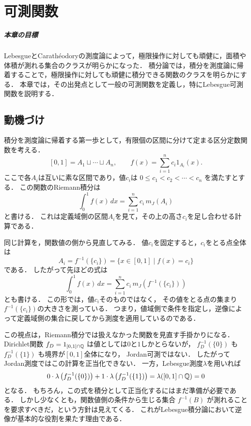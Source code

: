 \setcounter{chapter}{6}
\chapter{可測関数}

\paragraph{本章の目標}
LebesgueとCarathéodoryの測度論によって，極限操作に対しても頑健に，面積や体積が測れる集合のクラスが明らかになった．
積分論では，積分を測度論に帰着することで，極限操作に対しても頑健に積分できる関数のクラスを明らかにする．
本章では，その出発点として一般の可測関数を定義し，特にLebesgue可測関数を説明する．

\section{動機づけ}
積分を測度論に帰着する第一歩として，有限個の区間に分けて定まる区分定数関数を考える．
\[
[0,1]=A_1\sqcup\cdots\sqcup A_n,\qquad
f(x) = \sum_{i=1}^n c_i 1_{A_i}(x).
\]
ここで各$A_i$は互いに素な区間であり，値$c_i$は
$0\le c_1<c_2<\cdots<c_n$ を満たすとする．
この関数のRiemann積分は
\[
\int_0^1 f(x)\,dx = \sum_{i=1}^n c_i\,m_J(A_i)
\]
と書ける．
これは定義域側の区間$A_i$を見て，その上の高さ$c_i$を足し合わせる計算である．

同じ計算を，関数値の側から見直してみる．
値$c_i$を固定すると，$c_i$をとる点全体は
\[
A_i = f^{-1}(\{c_i\})
= \{ x \in [0,1] \mid f(x)=c_i \}
\]
である．
したがって先ほどの式は
\[
\int_0^1 f(x)\,dx
= \sum_{i=1}^n c_i\,m_J\left(f^{-1}(\{c_i\})\right)
\]
とも書ける．
この形では，値$c_i$そのものではなく，
その値をとる点の集まり$f^{-1}(\{c_i\})$の大きさを測っている．
つまり，値域側で条件を指定し，逆像によって定義域側の集合に戻してから測度を適用しているのである．

この視点は，Riemann積分では扱えなかった関数を見直す手掛かりになる．
Dirichlet関数 $f_D = 1_{[0,1]\cap\mathbb Q}$ は値としては$0$と$1$しかとらないが，
$f_D^{-1}(\{0\})$ も $f_D^{-1}(\{1\})$ も境界が$[0,1]$全体になり，
Jordan可測ではない．
したがってJordan測度ではこの計算を正当化できない．
一方，Lebesgue測度$\lambda$を用いれば
\[
0\cdot \lambda\left(f_D^{-1}(\{0\})\right)
+1\cdot \lambda\left(f_D^{-1}(\{1\})\right)
= \lambda([0,1]\cap\mathbb Q)
=0
\]
となる．
もちろん，この式を積分として正当化するにはまだ準備が必要である．
しかし少なくとも，関数値側の条件から生じる集合
$f^{-1}(B)$ が測れることを要求すべきだ，という方針は見えてくる．
これがLebesgue積分論において逆像が基本的な役割を果たす理由である．

